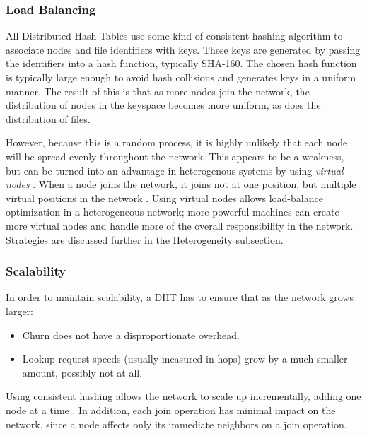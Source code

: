 \documentclass[10pt,letterpaper]{report}
\begin{document}
\subsubsection{Load Balancing}
All Distributed Hash Tables use some kind of consistent hashing algorithm to associate nodes and file identifiers with keys.  
These keys are generated by passing the identifiers into a hash function, typically SHA-160.
The chosen hash function is typically large enough to avoid hash collisions and generates keys in a uniform manner. 
The result of this is that as more nodes join the network, the distribution of nodes in the keyspace becomes more uniform, as does the distribution of files.

However, because this is a random process, it is highly unlikely that each node will be spread evenly throughout the network.
This appears to be a weakness, but can be turned into an advantage in heterogenous systems by using \textit{virtual nodes} \cite{godfrey2005heterogeneity} \cite{dynamo}.
When a node joins the network, it joins not at one position, but multiple virtual positions in the network \cite{dynamo}.
Using virtual nodes allows load-balance optimization in a heterogeneous network; more powerful machines can create more virtual nodes and handle more of  the overall responsibility in the network.
Strategies are discussed further in the Heterogeneity subsection.






\subsubsection{Scalability}
In order to maintain scalability, a DHT has to ensure that as the network grows larger:
\begin{itemize}
    \item Churn does not have a disproportionate overhead.
    \item Lookup request speeds (usually measured in hops) grow by a much smaller amount, possibly not at all.
\end{itemize}

Using consistent hashing allows the network to scale up incrementally, adding one node at a time \cite{dynamo}.
In addition, each join operation has minimal impact on the network, since a node affects only its immediate neighbors on a join operation.
\end{document}
